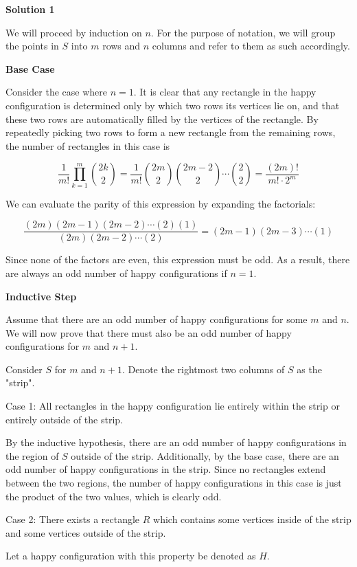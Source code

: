 \begin{enumerate}
 



\textbf{Solution 1}

We will proceed by induction on $n$. For the purpose of notation, we will group the points in $S$ into $m$ rows and $n$ columns and refer to them as such accordingly.

 
\textbf{Base Case}

 Consider the case where $n=1$. It is clear that any rectangle in the happy configuration is determined only by which two rows its vertices lie on, and that these two rows are automatically filled by the vertices of the rectangle. By repeatedly picking two rows to form a new rectangle from the remaining rows, the number of rectangles in this case is

 
 \[\frac{1}{m!}\prod_{k=1}^{m}\binom{2k}{2}=\frac{1}{m!}\binom{2m}{2}\binom{2m-2}{2}\cdots\binom{2}{2}=\frac{(2m)!}{m!\cdot2^m}\]

 We can evaluate the parity of this expression by expanding the factorials:

 
 \[\frac{(2m)(2m-1)(2m-2)\cdots(2)(1)}{(2m)(2m-2)\cdots(2)}=(2m-1)(2m-3)\cdots(1)\]

 Since none of the factors are even, this expression must be odd. As a result, there are always an odd number of happy configurations if $n=1$.

 
\textbf{Inductive Step}

 Assume that there are an odd number of happy configurations for some $m$ and $n$. We will now prove that there must also be an odd number of happy configurations for $m$ and $n+1$.

 Consider $S$ for $m$ and $n+1$. Denote the rightmost two columns of $S$ as the "strip".

 
Case 1: All rectangles in the happy configuration lie entirely within the strip or entirely outside of the strip.

 By the inductive hypothesis, there are an odd number of happy configurations in the region of $S$ outside of the strip. Additionally, by the base case, there are an odd number of happy configurations in the strip. Since no rectangles extend between the two regions, the number of happy configurations in this case is just the product of the two values, which is clearly odd.

 
Case 2: There exists a rectangle $R$ which contains some vertices inside of the strip and some vertices outside of the strip.

 Let a happy configuration with this property be denoted as $H$.


\end{enumerate}

